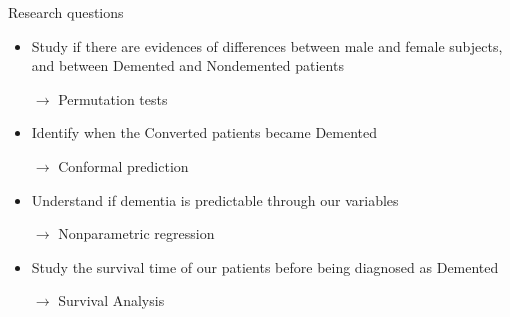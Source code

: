 \documentclass{beamer}
\begin{document}
\begin{frame}{Research questions}
	\begin{itemize}
		\item Study if there are evidences of differences between male and female subjects, and between Demented and Nondemented patients
	
		$\rightarrow$ Permutation tests
		
		\item Identify when the Converted patients became Demented
		
		$\rightarrow$ Conformal prediction 
		
		\item Understand if dementia is predictable through our variables
		
		$\rightarrow$ Nonparametric regression
		
		\item Study the survival time of our patients before being diagnosed as Demented
		
		$\rightarrow$ Survival Analysis

		
	\end{itemize}
\end{frame}
\end{document}
